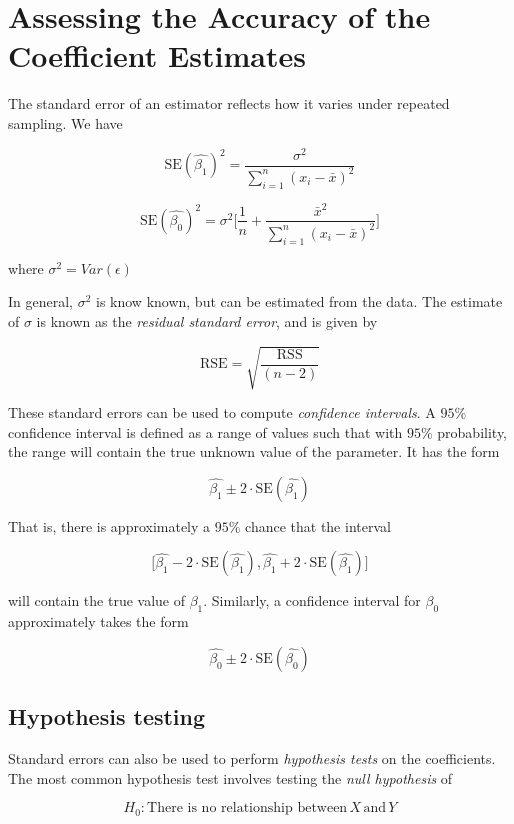 \documentclass[]{book}
\begin{document}
\section{Assessing the Accuracy of the Coefficient
Estimates}\label{assessing-the-accuracy-of-the-coefficient-estimates}

The standard error of an estimator reflects how it varies under repeated
sampling. We have

\[ \text{SE}(\hat{\beta_1})^2 =  \frac{\sigma^2}{\sum_{i=1}^{n} (x_i - \bar{x})^2} \]

\[ \text{SE}(\hat{\beta_0})^2 = \sigma^2 \bigg[ \frac{1}{n} +  \frac{\bar{x}^2}{\sum_{i=1}^{n} (x_i - \bar{x})^2} \bigg] \]

where \(\sigma^2 = Var(\epsilon)\)

In general, \(\sigma^2\) is know known, but can be estimated from the
data. The estimate of \(\sigma\) is known as the \emph{residual standard
error}, and is given by

\[ \text{RSE} = \sqrt{\frac{\text{RSS}}{(n-2)}} \]

These standard errors can be used to compute \emph{confidence
intervals}. A \(95\%\) confidence interval is defined as a range of
values such that with \(95\%\) probability, the range will contain the
true unknown value of the parameter. It has the form

\[ \hat{\beta_1} \pm 2 \cdot \text{SE}(\hat{\beta_1}) \]

That is, there is approximately a \(95\%\) chance that the interval

\[ \bigg[  \hat{\beta_1} - 2 \cdot \text{SE}(\hat{\beta_1}), \hat{\beta_1} + 2 \cdot \text{SE}(\hat{\beta_1})   \bigg] \]

will contain the true value of \(\beta_1\). Similarly, a confidence
interval for \(\beta_0\) approximately takes the form

\[ \hat{\beta_0} \pm 2 \cdot \text{SE}(\hat{\beta_0}) \]

\subsection*{Hypothesis testing}\label{hypothesis-testing}

Standard errors can also be used to perform \emph{hypothesis tests} on
the coefficients. The most common hypothesis test involves testing the
\emph{null hypothesis} of

\[ H_0 : \text{There is no relationship between} \, X \, \text{and} \, Y \]
\end{document}
